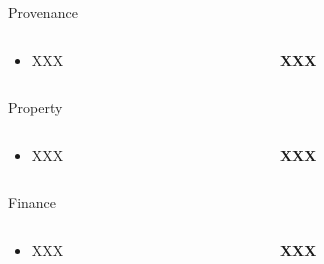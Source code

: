 \documentclass[pdf,table]{beamer}
\begin{document}
\begin{frame}{Provenance}
	\begin{columns}[T]
		\begin{column}{0.48\textwidth}
			\begin{itemize}
				\item XXX 
			\end{itemize}
		\end{column}
		\begin{column}{0.48\textwidth}
			{\bf XXX}
		\end{column}
	\end{columns}	
\end{frame}

\begin{frame}{Property}
	\begin{columns}[T]
		\begin{column}{0.48\textwidth}
			\begin{itemize}
				\item XXX 
			\end{itemize}
		\end{column}
		\begin{column}{0.48\textwidth}
			{\bf XXX}
		\end{column}
	\end{columns}	
\end{frame}

\begin{frame}{Finance}
	\begin{columns}[T]
		\begin{column}{0.48\textwidth}
			\begin{itemize}
				\item XXX 
			\end{itemize}
		\end{column}
		\begin{column}{0.48\textwidth}
			{\bf XXX}
		\end{column}
	\end{columns}	
\end{frame}
\end{document}
